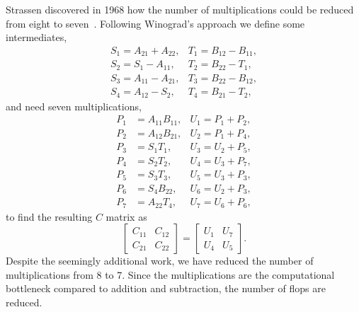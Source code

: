Strassen discovered in 1968 how the number of multiplications could be reduced from eight to seven~\cite{springerlink:10.1007/BF02165411}.
Following Winograd's approach we define some intermediates,
\begin{equation}
\label{eq:OpenCL:Strassen_intermediates}
\begin{matrix}
S_1 = A_{21} + A_{22}, & T_1 = B_{12} - B_{11},\\
S_2 = S_1 - A_{11}, & T_2 = B_{22} - T_1,\\
S_3 = A_{11} - A_{21}, & T_3 = B_{22} - B_{12},\\
S_4 = A_{12} - S_2, & T_4 = B_{21} - T_2 ,
\end{matrix}
\end{equation}
and need seven multiplications,
\begin{equation}
\label{eq:OpenCL:Strassen_multiplications}
\begin{matrix}
P_1 &= A_{11} B_{11}, & U_1 = P_1 + P_2, \\
P_2 &= A_{12} B_{21}, & U_2 = P_1 + P_4, \\
P_3 &= S_1 T_1, & U_3 = U_2 + P_5,\\
P_4 &= S_2 T_2, & U_4 = U_3 + P_7,\\
P_5 &= S_3 T_3, & U_5 = U_3 + P_3,\\
P_6 &= S_4 B_{22}, & U_6 = U_2 + P_3,\\
P_7 &= A_{22} T_4, & U_7 = U_6 + P_6 ,
\end{matrix} 
\end{equation}
to find the resulting $C$ matrix as
\begin{equation}
\begin{bmatrix}
C_{11} & C_{12} \\
C_{21} & C_{22}
\end{bmatrix}
=
\begin{bmatrix}
U_1 & U_7 \\
U_4 & U_5 
\end{bmatrix}
.
\end{equation}
Despite the seemingly additional work, we have reduced the number of multiplications from 8 to 7. Since the multiplications are the computational bottleneck compared to addition and subtraction, the number of flops are reduced.


